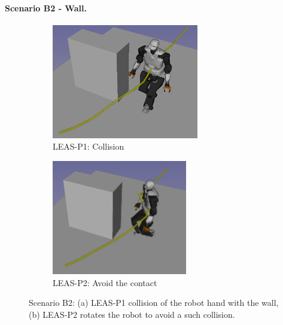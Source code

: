
\paragraph{Scenario B2 - Wall.}
\begin{figure}[t]
    \captionsetup[subfigure]{justification=centering}
    \centering
    \begin{subfigure}[t]{0.48\linewidth}
        \includegraphics[width=\textwidth, height=5cm]{Figures/Chapter_CPSB/avoid_wall_fail.png}
        \caption{LEAS-P1: Collision\label{fig:cp-sb:talos_wall_collision}}
        \label{fig:cp-sb:talos_wall:p1}
    \end{subfigure}
    \begin{subfigure}[t]{0.48\linewidth}
        \includegraphics[width=\textwidth, height=5cm]{Figures/Chapter_CPSB/avoid_wall.png}
        \caption{LEAS-P2: Avoid the contact\label{fig:cp-sb:talos_wall_ok}}
        \label{fig:cp-sb:talos_wall:p2}
    \end{subfigure}
    \caption{Scenario B2: (a) LEAS-P1 collision of the robot hand with the wall, (b) LEAS-P2 rotates the robot to avoid a such collision.}
    \label{fig:cp-sb:talos_wall}
\end{figure}

